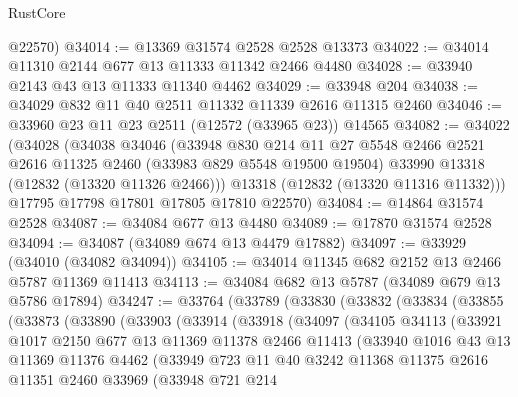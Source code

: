 \begin{lexlean}{RustCore}
\begin{coremodule}
      @22570)
@34014 := @13369 @31574 @2528 @2528 @13373
@34022 := @34014 @11310 @2144 @677 @13 @11333 @11342 @2466 @4480
@34028 := @33940 @2143 @43 @13 @11333 @11340 @4462
@34029 := @33948 @204
@34038 := @34029 @832 @11 @40 @2511 @11332 @11339 @2616 @11315 @2460
@34046 := @33960 @23 @11 @23 @2511 (@12572 (@33965 @23)) @14565
@34082 := @34022
    (@34028
      (@34038
        @34046
        (@33948
          @830
          @214
          @11
          @27
          @5548
          @2466
          @2521
          @2616
          @11325
          @2460
          (@33983 @829 @5548 @19500 @19504)
          @33990
          @13318
          (@12832 (@13320 @11326 @2466)))
        @13318
        (@12832 (@13320 @11316 @11332)))
      @17795
      @17798
      @17801
      @17805
      @17810
      @22570)
@34084 := @14864 @31574 @2528
@34087 := @34084 @677 @13 @4480
@34089 := @17870 @31574 @2528
@34094 := @34087 (@34089 @674 @13 @4479 @17882)
@34097 := @33929 (@34010 (@34082 @34094))
@34105 := @34014 @11345 @682 @2152 @13 @2466 @5787 @11369 @11413
@34113 := @34084 @682 @13 @5787 (@34089 @679 @13 @5786 @17894)
@34247 := @33764
    (@33789
      (@33830
        (@33832
          (@33834
            (@33855
              (@33873
                (@33890
                  (@33903
                    (@33914
                      (@33918
                        (@34097
                          (@34105
                            @34113
                            (@33921
                              @1017
                              @2150
                              @677
                              @13
                              @11369
                              @11378
                              @2466
                              @11413
                              (@33940
                                @1016
                                @43
                                @13
                                @11369
                                @11376
                                @4462
                                (@33949
                                  @723
                                  @11
                                  @40
                                  @3242
                                  @11368
                                  @11375
                                  @2616
                                  @11351
                                  @2460
                                  @33969
                                  (@33948
                                    @721
                                    @214

\end{coremodule}
\end{lexlean}
